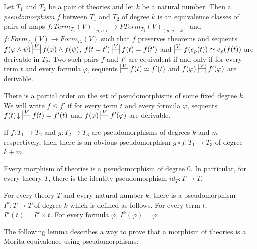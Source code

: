 \documentclass[reqno]{amsart}
\theoremstyle{definition}
\theoremstyle{remark}
\numberwithin{figure}{section}
\begin{document}
\begin{defn}
Let $T_1$ and $T_2$ be a pair of theories and let $k$ be a natural number.
Then a \emph{pseudomorphism} $f$ between $T_1$ and $T_2$ of degree $k$ is an equivalence classes of pairs of maps $f : Term_{T_1}(V)_{(p,n)} \to PTerm_{T_2}(V)_{(p,n+k)}$ and
$f : Form_{T_1}(V) \to Form_{T_2}(V)$ such that $f$ preserves theorems and sequents $f(\varphi \land \psi) \ssststile{}{V} f(\varphi) \land f(\psi)$,
$f(t = t') \ssststile{}{V} f(t) = f(t')$ and $\sststile{}{V} f(e_p(t)) \simeq e_p(f(t))$ are derivable in $T_2$.
Two such pairs $f$ and $f'$ are equivalent if and only if for every term $t$ and every formula $\varphi$,
sequents $\sststile{}{V} f(t) \simeq f'(t)$ and $f(\varphi) \ssststile{}{V} f'(\varphi)$ are derivable.

There is a partial order on the set of pseudomorphisms of some fixed degree $k$.
We will write $f \leq f'$ if for every term $t$ and every formula $\varphi$,
sequents $f(t)\!\downarrow\ \sststile{}{V} f(t) = f'(t)$ and $f(\varphi) \sststile{}{V} f'(\varphi)$ are derivable.
\end{defn}

\begin{example}
If $f : T_1 \to T_2$ and $g : T_2 \to T_3$ are pseudomorphisms of degrees $k$ and $m$ respectively, then there is an obvious pseudomorphism $g \circ f : T_1 \to T_3$ of degree $k+m$.
\end{example}

\begin{example}
Every morphism of theories is a pseudomorphism of degree 0.
In particular, for every theory $T$, there is the identity pseudomorphism $id_T : T \to T$.
\end{example}

\begin{example}
For every theory $T$ and every natural number $k$, there is a pseudomorphism $I^k : T \to T$ of degree $k$ which is defined as follows.
For every term $t$, $I^k(t) = I^k \times t$.
For every formula $\varphi$, $I^k(\varphi) = \varphi$.
\end{example}

The following lemma describes a way to prove that a morphism of theories is a Morita equivalence using pseudomorphisms:
\end{document}

